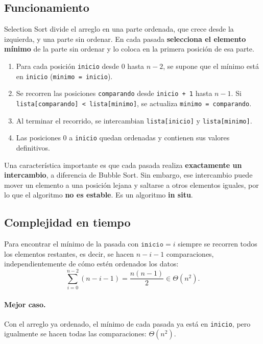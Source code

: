 \subsection{Funcionamiento}

Selection Sort divide el arreglo en una parte ordenada, que crece desde la izquierda, y una parte sin ordenar. En cada pasada \textbf{selecciona el elemento mínimo} de la parte sin ordenar y lo coloca en la primera posición de esa parte.

\begin{enumerate}
  \item Para cada posición \texttt{inicio} desde $0$ hasta $n-2$, se supone que el mínimo está en \texttt{inicio} (\texttt{minimo = inicio}).
  \item Se recorren las posiciones \texttt{comparando} desde \texttt{inicio + 1} hasta $n-1$. Si \texttt{lista[comparando] < lista[minimo]}, se actualiza \texttt{minimo = comparando}.
  \item Al terminar el recorrido, se intercambian \texttt{lista[inicio]} y \texttt{lista[minimo]}.
  \item Las posiciones $0$ a \texttt{inicio} quedan ordenadas y contienen sus valores definitivos.
\end{enumerate}

Una característica importante es que cada pasada realiza \textbf{exactamente un intercambio}, a diferencia de Bubble Sort. Sin embargo, ese intercambio puede mover un elemento a una posición lejana y saltarse a otros elementos iguales, por lo que el algoritmo \textbf{no es estable}. Es un algoritmo \textbf{in situ}.

\subsection{Complejidad en tiempo}

Para encontrar el mínimo de la pasada con $\texttt{inicio} = i$ siempre se recorren todos los elementos restantes, es decir, se hacen $n-i-1$ comparaciones, independientemente de cómo estén ordenados los datos:
\[
  \sum_{i=0}^{n-2} (n-i-1) = \frac{n(n-1)}{2} \in \Theta(n^2).
\]

\paragraph{Mejor caso.} Con el arreglo ya ordenado, el mínimo de cada pasada ya está en \texttt{inicio}, pero igualmente se hacen todas las comparaciones: $\Theta(n^2)$.

